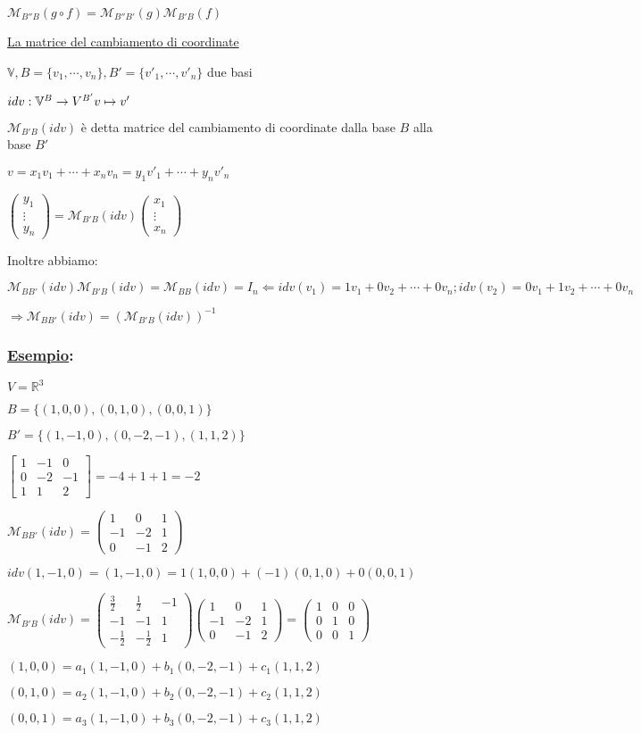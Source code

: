 \documentclass{article}
\newcommand{\ul}[1]{\underline{#1}}
\newcommand{\R}{\mathbb{R}}
\newcommand{\V}{\mathbb{V}}
\newcommand{\M}{\mathcal{M}}
\newcommand{\Esempio}[1]{\subsubsection*{\ul{Esempio}:}#1}
\begin{document}
$\M_{B''B}(g\circ f)=\M_{B''B'}(g)\M_{B'B}(f)$

\ul{La matrice del cambiamento di coordinate}

$\V, B=\{v_1,\cdots,v_n\}, B'=\{v'_1,\cdots,v'_n\}$ due basi

$idv:\V^B\rightarrow V^{B'}\\v\mapsto v'$

$\M_{B'B}(idv)$ è detta matrice del cambiamento di coordinate dalla base $B$ alla base $B'$

$v=x_1v_1+\cdots+x_nv_n=y_1v'_1+\cdots+y_nv'_n$

$\begin{pmatrix}y_1\\\vdots\\y_n\end{pmatrix}=\M_{B'B}(idv)\begin{pmatrix}x_1\\\vdots\\x_n\end{pmatrix}$

Inoltre abbiamo:

$\M_{BB'}(idv)\M_{B'B}(idv)=\M_{BB}(idv)=I_n\Leftarrow idv(v_1)=1v_1+0v_2+\cdots+0v_n;idv(v_2)=0v_1+1v_2+\cdots+0v_n$

$\Rightarrow\M_{BB'}(idv)=(\M_{B'B}(idv))^{-1}$

\Esempio{
	$V=\R^3$

	$B=\{(1,0,0),(0,1,0),(0,0,1)\}$

	$B'=\{(1,-1,0),(0,-2,-1),(1,1,2)\}$

	$\begin{bmatrix}
		1 & -1 & 0  \\
		0 & -2 & -1 \\
		1 & 1  & 2
	\end{bmatrix}=-4+1+1=-2$

	$\M_{BB'}(idv)=\begin{pmatrix}
		1  & 0  & 1 \\
		-1 & -2 & 1 \\
		0  & -1 & 2
	\end{pmatrix}$

	$idv(1,-1,0)=(1,-1,0)=1(1,0,0)+(-1)(0,1,0)+0(0,0,1)$

	$\M_{B'B}(idv)=\begin{pmatrix}
		\frac{3}{2}  & \frac{1}{2}  & -1 \\
		-1           & -1           & 1  \\
		-\frac{1}{2} & -\frac{1}{2} & 1
		\end{pmatrix}\begin{pmatrix}
		1  & 0  & 1 \\
		-1 & -2 & 1 \\
		0  & -1 & 2
		\end{pmatrix}=\begin{pmatrix}
		1 & 0 & 0 \\
		0 & 1 & 0 \\
		0 & 0 & 1
	\end{pmatrix}$

	$(1,0,0)=a_1(1,-1,0)+b_1(0,-2,-1)+c_1(1,1,2)$

	$(0,1,0)=a_2(1,-1,0)+b_2(0,-2,-1)+c_2(1,1,2)$

	$(0,0,1)=a_3(1,-1,0)+b_3(0,-2,-1)+c_3(1,1,2)$
}
\end{document}
